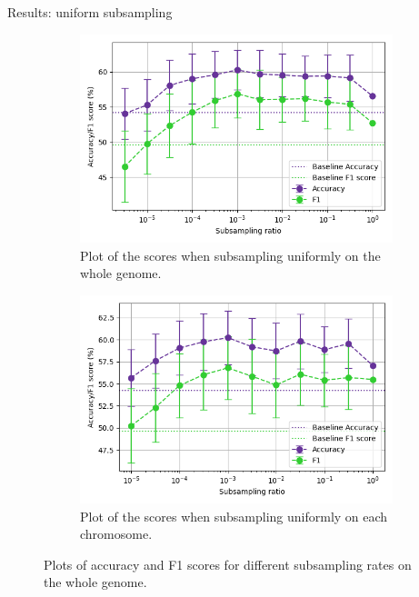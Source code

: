 \documentclass[aspectratio=169]{beamer}
\begin{document}
\begin{frame}{Results: uniform subsampling}
\begin{figure}[ht!]
    \centering
    \begin{subfigure}[t]{0.49\textwidth}
    \centering
\includegraphics[width=\columnwidth]{../figures/subsample_plot.png}
\caption{Plot of the scores when subsampling uniformly on the whole genome.}
\label{fig:res1a}
    \end{subfigure}
    \begin{subfigure}[t]{0.49\textwidth}
    \centering
\includegraphics[width=\columnwidth]{../figures/uniform_sample_low_ratio.png}
\caption{Plot of the scores when subsampling uniformly on each chromosome.}
\label{fig:res1b}
    \end{subfigure}
\caption{Plots of accuracy and F1 scores for different subsampling rates on the whole genome.}
\label{fig:res1}
\end{figure}
\end{frame}
\end{document}
